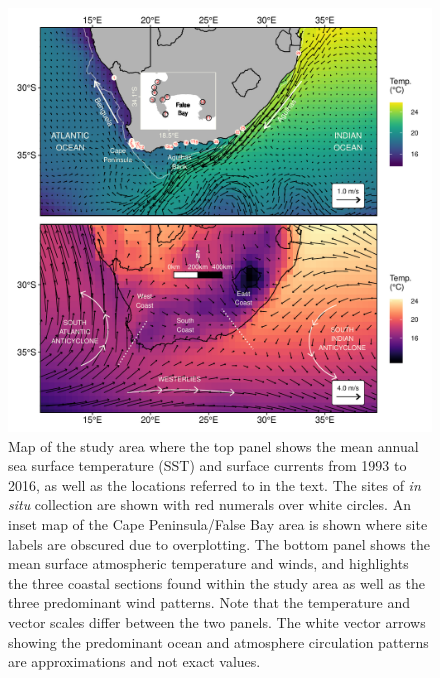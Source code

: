 \documentclass[utf8]{frontiersSCNS}
\begin{document}
\begin{figure}[]
\begin{center}
\includegraphics[width=1.0\textwidth]{figure_1.pdf}
\end{center}
\caption{Map of the study area where the top panel shows the mean annual sea surface temperature (SST) and surface currents from 1993 to 2016, as well as the locations referred to in the text. The sites of \emph{in situ} collection are shown with red numerals over white circles. An inset map of the Cape Peninsula/False Bay area is shown where site labels are obscured due to overplotting. The bottom panel shows the mean surface atmospheric temperature and winds, and highlights the three coastal sections found within the study area as well as the three predominant wind patterns. Note that the temperature and vector scales differ between the two panels. The white vector arrows showing the predominant ocean and atmosphere circulation patterns are approximations and not exact values.}
\label{figure1}
\end{figure}
\end{document}
